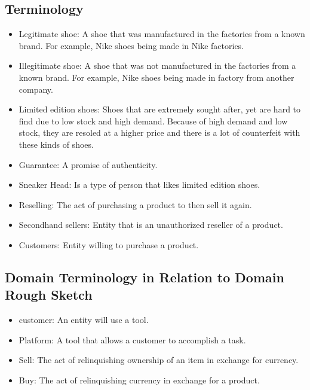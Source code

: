 \subsection{Terminology}
\begin{itemize}
  \item Legitimate shoe: A shoe that was manufactured in the factories from a known brand. For example, Nike shoes being made in Nike factories.
  \item Illegitimate shoe: A shoe that was not manufactured in the factories from a known brand. For example, Nike shoes being made in factory from another company.
  \item Limited edition shoes: Shoes that are extremely sought after, yet are hard to find due to low stock and high demand. Because of high demand and low stock, they are resoled at a higher price and there is a lot of counterfeit with these kinds of shoes.
  \item Guarantee: A promise of authenticity.
  \item Sneaker Head: Is a type of person that likes limited edition shoes.
  \item Reselling: The act of purchasing a product to then sell it again.
  \item Secondhand sellers: Entity that is an unauthorized reseller of a product.
  \item Customers: Entity willing to purchase a product.
\end{itemize}
\subsection{Domain Terminology in Relation to Domain Rough Sketch}
\begin{itemize}
  \item customer: An entity will use a tool.
  \item Platform: A tool that allows a customer to accomplish a task.
  \item Sell: The act of relinquishing ownership of an item in exchange for currency.
  \item Buy: The act of relinquishing currency in exchange for a product.
\end{itemize}
